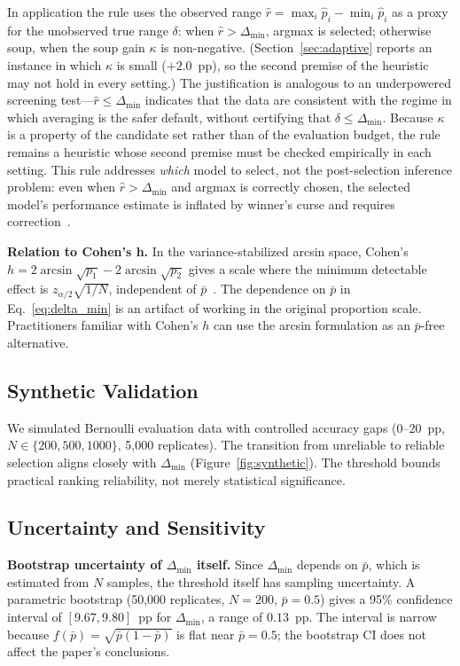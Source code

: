 \documentclass[pdflatex,sn-mathphys-ay,iicol]{sn-jnl}
\theoremstyle{thmstylethree}
\begin{document}
In application the rule uses the observed range $\hat r = \max_i \hat p_i - \min_i \hat p_i$ as a proxy for the unobserved true range $\delta$: when $\hat r > \Delta_{\min}$, argmax is selected; otherwise soup, when the soup gain $\kappa$ is non-negative. (Section~\ref{sec:adaptive} reports an instance in which $\kappa$ is small ($+2.0$~pp), so the second premise of the heuristic may not hold in every setting.) The justification is analogous to an underpowered screening test---$\hat r \leq \Delta_{\min}$ indicates that the data are consistent with the regime in which averaging is the safer default, without certifying that $\delta \leq \Delta_{\min}$. Because $\kappa$ is a property of the candidate set rather than of the evaluation budget, the rule remains a heuristic whose second premise must be checked empirically in each setting. This rule addresses \emph{which} model to select, not the post-selection inference problem: even when $\hat r > \Delta_{\min}$ and argmax is correctly chosen, the selected model's performance estimate is inflated by winner's curse and requires correction~\citep{zrnic2024flexible,zhang2024winners}.

\textbf{Relation to Cohen's h.} In the variance-stabilized arcsin space, Cohen's $h = 2\arcsin\sqrt{p_1} - 2\arcsin\sqrt{p_2}$ gives a scale where the minimum detectable effect is $z_{\alpha/2}\sqrt{1/N}$, independent of $\bar{p}$~\citep{cohen1988statistical}. The dependence on $\bar{p}$ in Eq.~\eqref{eq:delta_min} is an artifact of working in the original proportion scale. Practitioners familiar with Cohen's $h$ can use the arcsin formulation as an $\bar{p}$-free alternative.

\subsection{Synthetic Validation}

We simulated Bernoulli evaluation data with controlled accuracy gaps (0--20~pp, $N\in\{200,500,1000\}$, 5,000 replicates). The transition from unreliable to reliable selection aligns closely with $\Delta_{\min}$ (Figure~\ref{fig:synthetic}). The threshold bounds practical ranking reliability, not merely statistical significance.

\subsection{Uncertainty and Sensitivity}

\noindent\textbf{Bootstrap uncertainty of $\Delta_{\min}$ itself.} Since $\Delta_{\min}$ depends on $\bar{p}$, which is estimated from $N$ samples, the threshold itself has sampling uncertainty. A parametric bootstrap (50,000 replicates, $N=200$, $\bar{p}=0.5$) gives a 95\% confidence interval of $[9.67, 9.80]$~pp for $\Delta_{\min}$, a range of $0.13$~pp. The interval is narrow because $f(\bar{p})=\sqrt{\bar{p}(1-\bar{p})}$ is flat near $\bar{p}=0.5$; the bootstrap CI does not affect the paper's conclusions.
\end{document}
